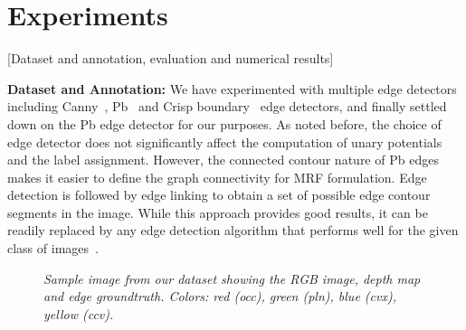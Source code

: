 \section{Experiments}
[Dataset and annotation, evaluation and numerical results]

{\bf Dataset and Annotation:} We have experimented with multiple edge detectors including Canny~\cite{canny}, Pb~\cite{martin2004} 
and Crisp boundary~\cite{isola14crisp} edge detectors, and finally settled down on the Pb edge detector for our purposes. As noted 
before, the choice of edge detector does not significantly affect the computation of unary potentials and the label assignment. 
However, the connected contour nature of Pb edges makes it easier to define the graph connectivity for MRF formulation. Edge 
detection is followed by edge linking to obtain a set of possible edge contour segments in the image. While this approach provides 
good results, it can be readily replaced by any edge detection algorithm that performs well for the given class of 
images~\cite{edgeDetectSurvey-Koschan}.

\begin{figure}[ht]
   \centering
    \hfill
    \hfill
    \hfill
   \caption{\it Sample image from our dataset showing the RGB image, depth map
   and edge groundtruth. Colors: red (occ), green (pln), blue (cvx), yellow (ccv).}
\label{fig:dataset_depth_GT}
\end{figure}

